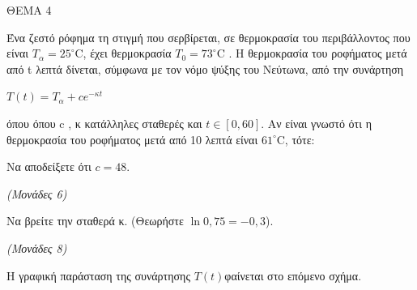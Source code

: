 \documentclass[11pt,a4paper,twoside]{book}
\newcommand{\monades}[1]{\hfill \textit{(Μονάδες #1)}}
\begin{document}
ΘΕΜΑ 4

Ένα ζεστό ρόφημα τη στιγμή που σερβίρεται, σε θερμοκρασία του περιβάλλοντος που είναι $T_\alpha = 25^\circ\text{C}$, έχει θερμοκρασία $T_0 = 73^\circ\text{C}$ . Η θερμοκρασία του ροφήματος μετά από t λεπτά δίνεται, σύμφωνα με τον νόμο ψύξης του Νεύτωνα, από την συνάρτηση

$T(t) = T_\alpha + c e^{-\kappa t}$

όπου όπου c , κ κατάλληλες σταθερές και $t \in [0, 60]$. Αν είναι γνωστό ότι η θερμοκρασία του ροφήματος μετά από 10 λεπτά είναι $61^\circ\text{C}$, τότε:

\begin{alist}
\item Να αποδείξετε ότι $c = 48$.

\monades{6}

\item Να βρείτε την σταθερά κ. (Θεωρήστε $\ln 0,75 = -0,3$).

\monades{8}

Η γραφική παράσταση της συνάρτησης $T(t)$φαίνεται στο επόμενο σχήμα.


\begin{center}


\end{center}



\end{alist}
\end{document}
